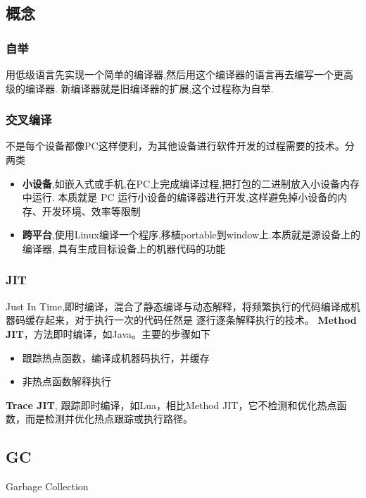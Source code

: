 \subsection{概念}

\subsubsection{自举}
用低级语言先实现一个简单的编译器,然后用这个编译器的语言再去编写一个更高级的编译器.
新编译器就是旧编译器的扩展,这个过程称为自举.

\subsubsection{交叉编译}
不是每个设备都像PC这样便利，为其他设备进行软件开发的过程需要的技术。分两类
\begin{itemize}
    \item {\textbf{小设备},如嵌入式或手机,在PC上完成编译过程,把打包的二进制放入小设备内存中运行.
    本质就是 PC 运行小设备的编译器进行开发,这样避免掉小设备的内存、开发环境、效率等限制}
    \item {\textbf{跨平台},使用Linux编译一个程序,移植portable到window上.本质就是源设备上的编译器,
    具有生成目标设备上的机器代码的功能}
\end{itemize}

\subsubsection{JIT}
Just In Time,即时编译，混合了静态编译与动态解释，将频繁执行的代码编译成机器码缓存起来，对于执行一次的代码任然是
逐行逐条解释执行的技术。
\newline
\textbf{Method JIT}，方法即时编译，如Java。主要的步骤如下
\begin{itemize}
    \item {跟踪热点函数，编译成机器码执行，并缓存}
    \item {非热点函数解释执行}
\end{itemize}
\textbf{Trace JIT}, 跟踪即时编译，如Lua，相比Method JIT，它不检测和优化热点函数，而是检测并优化热点跟踪或执行路径。

\subsection{GC}
Garbage Collection
